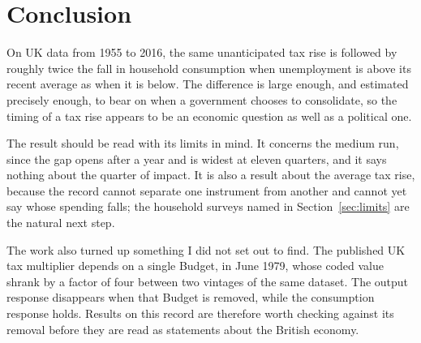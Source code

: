 \documentclass[11pt,a4paper]{article}
\begin{document}
\section{Conclusion}

On UK data from 1955 to 2016, the same unanticipated tax rise is followed by roughly twice the fall
in household consumption when unemployment is above its recent average as when it is below. The
difference is large enough, and estimated precisely enough, to bear on when a government chooses to
consolidate, so the timing of a tax rise appears to be an economic question as well as a political
one.

The result should be read with its limits in mind. It concerns the medium run, since the gap opens
after a year and is widest at eleven quarters, and it says nothing about the quarter of impact. It
is also a result about the average tax rise, because the record cannot separate one instrument from
another and cannot yet say whose spending falls; the household surveys named in
Section~\ref{sec:limits} are the natural next step.

The work also turned up something I did not set out to find. The published UK tax multiplier depends
on a single Budget, in June 1979, whose coded value shrank by a factor of four between two vintages of the same dataset. The output response disappears when that Budget is removed, while the consumption response holds. Results on this record are therefore worth checking against its removal
before they are read as statements about the British economy.



\end{document}
